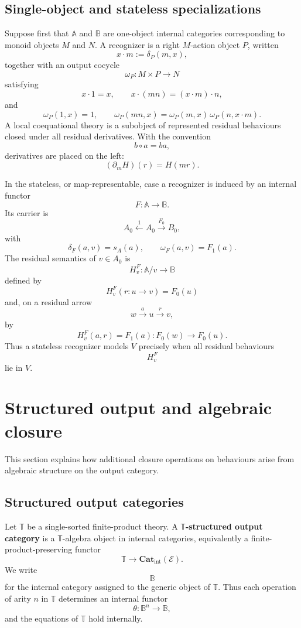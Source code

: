 \subsection{Single-object and stateless specializations}
\label{subsec:coeq-single-object-stateless}

Suppose first that \(\mathbb A\) and \(\mathbb B\) are one-object internal
categories corresponding to monoid objects \(M\) and \(N\). A recognizer is a
right \(M\)-action object \(P\), written
\[
    x\cdot m:=\delta_P(m,x),
\]
together with an output cocycle
\[
    \omega_P:M\times P\to N
\]
satisfying
\[
    x\cdot 1=x,
    \qquad
    x\cdot(mn)=(x\cdot m)\cdot n,
\]
and
\[
    \omega_P(1,x)=1,
    \qquad
    \omega_P(mn,x)
    =
    \omega_P(m,x)\,\omega_P(n,x\cdot m).
\]
A local coequational theory is a subobject of represented residual behaviours
closed under all residual derivatives. With the convention
\[
    b\circ a=ba,
\]
derivatives are placed on the left:
\[
    (\partial_mH)(r)=H(mr).
\]

In the stateless, or map-representable, case a recognizer is induced by an
internal functor
\[
    F:\mathbb A\to\mathbb B.
\]
Its carrier is
\[
    A_0\xleftarrow{1}A_0\xrightarrow{F_0}B_0,
\]
with
\[
    \delta_F(a,v)=s_A(a),
    \qquad
    \omega_F(a,v)=F_1(a).
\]
The residual semantics of \(v\in A_0\) is
\[
    H^F_v:\mathbb A/v\to\mathbb B
\]
defined by
\[
    H^F_v(r:u\to v)=F_0(u)
\]
and, on a residual arrow
\[
    w\xrightarrow{a}u\xrightarrow{r}v,
\]
by
\[
    H^F_v(a,r)=F_1(a):F_0(w)\to F_0(u).
\]
Thus a stateless recognizer models \(V\) precisely when all residual behaviours
\[
    H^F_v
\]
lie in \(V\).

\section{Structured output and algebraic closure}
\label{sec:structured-output-algebraic-closure}

This section explains how additional closure operations on behaviours arise
from algebraic structure on the output category.

\subsection{Structured output categories}
\label{subsec:structured-output-categories}

\begin{definition}
\label{def:structured-output-category}
    Let \(\mathbb T\) be a single-sorted finite-product theory. A
    \textbf{\(\mathbb T\)-structured output category} is a \(\mathbb T\)-algebra
    object in internal categories, equivalently a finite-product-preserving
    functor
    \[
        \mathbb T\longrightarrow \mathbf{Cat}_{\mathrm{int}}(\mathcal E).
    \]
    We write
    \[
        \mathbb B
    \]
    for the internal category assigned to the generic object of \(\mathbb T\).
    Thus each operation of arity \(n\) in \(\mathbb T\) determines an internal
    functor
    \[
        \theta:\mathbb B^n\to\mathbb B,
    \]
    and the equations of \(\mathbb T\) hold internally.
\end{definition}

